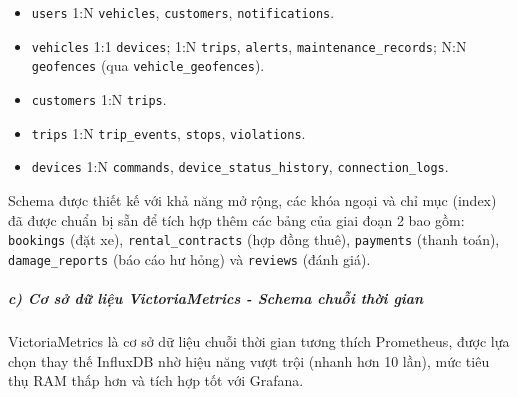 \documentclass[a4paper]{extarticle}
\providecommand{\tightlist}{%
  \setlength{\itemsep}{0pt}\setlength{\parskip}{0pt}}
\begin{document}
\begin{itemize}
\tightlist
\item
  \texttt{users} 1:N \texttt{vehicles}, \texttt{customers},
  \texttt{notifications}.
\item
  \texttt{vehicles} 1:1 \texttt{devices}; 1:N \texttt{trips},
  \texttt{alerts}, \texttt{maintenance\_records}; N:N \texttt{geofences}
  (qua \texttt{vehicle\_geofences}).
\item
  \texttt{customers} 1:N \texttt{trips}.
\item
  \texttt{trips} 1:N \texttt{trip\_events}, \texttt{stops},
  \texttt{violations}.
\item
  \texttt{devices} 1:N \texttt{commands}, \texttt{device\_status\_history},
  \texttt{connection\_logs}.
\end{itemize}

Schema được thiết kế với khả năng mở rộng, các khóa ngoại và chỉ mục
(index) đã được chuẩn bị sẵn để tích hợp thêm các bảng của giai đoạn 2 bao gồm:
\texttt{bookings} (đặt xe), \texttt{rental\_contracts} (hợp đồng thuê), \texttt{payments} (thanh
toán), \texttt{damage\_reports} (báo cáo hư hỏng) và \texttt{reviews} (đánh giá).

\subparagraph{c) Cơ sở dữ liệu VictoriaMetrics - Schema chuỗi thời
gian}\label{c-cux1a1-sux1edf-dux1eef-liux1ec7u-victoriametrics---schema-chuux1ed7i-thux1eddi-gian}

VictoriaMetrics là cơ sở dữ liệu chuỗi thời gian tương thích Prometheus,
được lựa chọn thay thế InfluxDB nhờ hiệu năng vượt trội (nhanh hơn 10
lần), mức tiêu thụ RAM thấp hơn và tích hợp tốt với Grafana.
\end{document}
